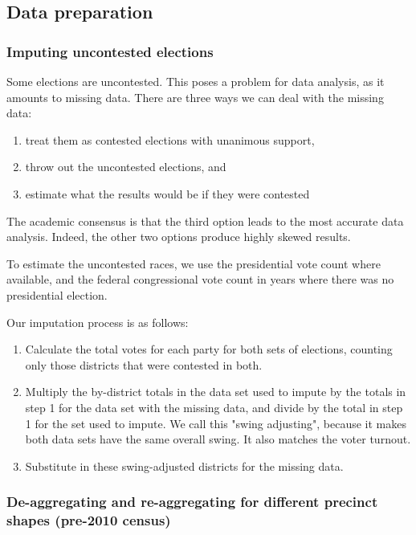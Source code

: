 \documentclass[preprint,12pt]{article}
\begin{document}
\subsection{Data preparation}
\subsubsection{Imputing uncontested elections}
 
Some elections are uncontested.   This poses a problem for data analysis, as it amounts to missing data.  There are three ways we can deal with the missing data: 
 

\begin{enumerate}
\item treat them as contested elections with unanimous support, 
\item throw out the uncontested elections, and 
\item estimate what the results would be if they were contested
\end{enumerate}
 
The academic consensus is that the third option leads to the most accurate data analysis.  Indeed, the other two options produce highly skewed results.
 
To estimate the uncontested races, we use the presidential vote count where available, and the federal congressional vote count in years where there was no presidential election.
 
Our imputation process is as follows:
 
\begin{enumerate}
\item Calculate the total votes for each party for both sets of elections, counting only those districts that were contested in both.
\item Multiply the by-district totals in the data set used to impute by the totals in step 1 for the data set with the missing data, and divide by the total in step 1 for the set used to impute.  We call this "swing adjusting", because it makes both data sets have the same overall swing.  It also matches the voter turnout.
\item Substitute in these swing-adjusted districts for the missing data.
\end{enumerate}
 
\subsubsection{De-aggregating and re-aggregating for different precinct shapes (pre-2010 census)}
 
\end{document}
